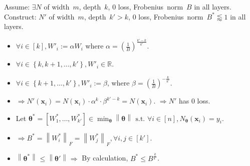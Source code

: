 \documentclass[handout,usenames,dvipsnames]{beamer} %
\newcommand{\norm}[2][]{{\left\|{#2}\right\|_{#1}}}
\newcommand{\set}[1]{\left\{{#1}\right\}}
\newcommand{\bx}{\mathbf{x}}
\newcommand{\btheta}{{\boldsymbol{\theta}}}
\newcommand{\reals}{{\mathbb R}}
\begin{document}
\begin{frame}
    Assume: $\exists N$ of width~$m$, depth~$k$, $0$ loss, Frobenius~norm~$B$ in all layers.\\
    Construct: $N'$ of width~$m$, depth~$k' > k$, $0$ loss, Frobenius~norm~$B^* \lessapprox 1$ in all layers.
    \pause
    \begin{itemize}
        \item $\forall i \in [k], W'_i := \alpha W_i$ where $\alpha = \left( \frac{1}{B} \right)^{\frac{k'-k}{k'}}$.
        \pause
        \item $\forall i \in \set{k, k+1, \ldots, k'}, W'_i \in \reals$.
        \pause
        \item $\forall i \in \set{k+1, \ldots, k'}, W'_i := \beta$, where $\beta = \left( \frac{1}{B} \right)^{-\frac{k}{k'}}$.
        \pause
        \item $\Rightarrow N'(\bx_i) = N(\bx_i) \cdot \alpha^k \cdot \beta^{k'-k} = N(\bx_i)$. 
        \pause
        $\Rightarrow N'$ has $0$ loss.
        \pause
        \item Let $\btheta^* = \left[W^*_1,\ldots,W^*_{k'} \right] \in \min_\btheta \norm{\btheta} \text{ s.t. } \forall i \in [n], N_\btheta(\bx_i)=y_i$.
        \pause
        \item $\Rightarrow B^* = \norm{W^*_i}_F = \norm{W^*_j}_F, \forall i, j \in [k']$.
        \pause
        \item $\norm{\btheta^*} \leq \norm{\btheta'} \Rightarrow$ By calculation, $B^* \leq B^{\frac{k}{k'}}$.
        \hfill\qedsymbol
    \end{itemize}
    

\end{frame}
\end{document}
